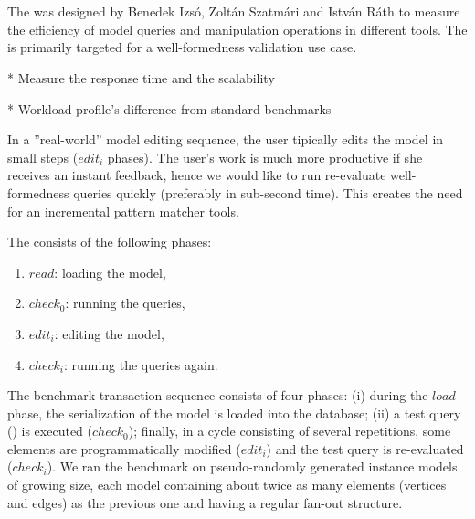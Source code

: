 \section{\tb{}}
\label{trainbenchmark}

The \tb{} was designed by Benedek Izsó, Zoltán Szatmári and István Ráth \cite{high-performance-queries} to measure the efficiency of model queries and manipulation operations in different tools. The \tb{} is primarily targeted for a well-formedness validation use case. 


* Measure the response time and the scalability

* Workload profile's difference from standard benchmarks


In a ''real-world'' model editing sequence, the user tipically edits the model in small steps ($\mathit{edit}_i$ phases). The user's work is much more productive if she receives an instant feedback, hence we would like to run re-evaluate well-formedness queries quickly (preferably in sub-second time). This creates the need for an incremental pattern matcher tools.



The \tb{} consists of the following phases:

\begin{enumerate}
  \item $\mathit{read}$: loading the model,
  \item $\mathit{check}_0$: running the queries,
  \item $\mathit{edit}_i$: editing the model, 
  \item $\mathit{check}_i$: running the queries again.
\end{enumerate}



The benchmark transaction sequence consists of four phases: (i) during the $\mathit{load}$ phase, the serialization of the model is loaded into the database; (ii) a test query () is executed ($\mathit{check}_0$); finally, in a cycle consisting of several repetitions, some elements are programmatically modified ($\mathit{edit}_i$) and the test query is re-evaluated ($\mathit{check}_i$). We ran the benchmark on pseudo-randomly generated instance models of growing size, each model containing about twice as many elements (vertices and edges) as the previous one and having a regular fan-out structure. 



